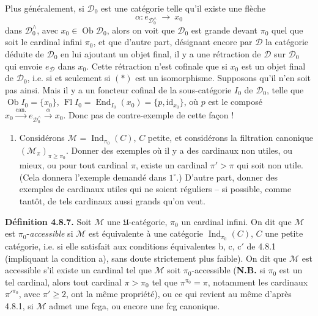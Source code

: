 \documentclass[11pt]{article}
\newcommand{\msp}[1]{\marginpar{\footnotesize [#1]}}
\newcommand{\Ob}{\operatorname{Ob}}
\newcommand{\Ind}{\operatorname{Ind}}
\newcommand{\End}{\operatorname{End}}
\newcommand{\Fl}{\operatorname{Fl}}
\begin{document}
Plus généralement, si $\mathcal{D}_0$ est une catégorie telle qu'il existe une flèche
\[
\alpha : e_{\mathcal{D}_0^\wedge} \ \longrightarrow \ x_0 \tag*{$(*)$}
\]
dans $\mathcal{D}_0^\wedge$, avec $x_0\in\Ob\mathcal{D}_0$, alors on voit que $\mathcal{D}_0$ est grande devant $\pi_0$ quel que soit le cardinal infini $\pi_0$, et que d'autre part, désignant encore par $\mathcal{D}$ la catégorie déduite de $\mathcal{D}_0$ en lui ajoutant un objet final, il y a une rétraction de $\mathcal{D}$ sur $\mathcal{D}_0$ qui envoie $e_{\mathcal{D}}$ dans $x_0$. Cette rétraction n'est cofinale que si $x_0$ est un objet final de $\mathcal{D}_0$, i.e. si et seulement si $(*)$ est un isomorphisme. Supposons qu'il n'en soit pas ainsi. Mais il y a un foncteur cofinal de la sous-catégorie $I_0$ de $\mathcal{D}_0$, telle que $\Ob I_0=\{x_0\}$, $\Fl I_0=\End_{I_0}(x_0)=\{p,\mathrm{id}_{x_0}\}$, où $p$ est le composé $x_0\xrightarrow{\text{can.}}e_{\mathcal{D}_0^\wedge}\xrightarrow{\alpha}x_0$. Donc pas de contre-exemple de cette façon !

\msp{page 205}
\begin{enumerate}
\item[4)] Considérons $\mathcal{M}=\Ind_{\pi_0}(C)$, $C$ petite, et considérons la filtration canonique $(\mathcal{M}_\pi)_{\pi\geqslant\pi_0}$. Donner des exemples où il y a des cardinaux non utiles, ou mieux, ou pour tout cardinal $\pi$, existe un cardinal $\pi'>\pi$ qui soit non utile. (Cela donnera l'exemple demandé dans $1^\circ$.) D'autre part, donner des exemples de cardinaux utiles qui ne soient réguliers -- si possible, comme tantôt, de tels cardinaux aussi grands qu'on veut.
\end{enumerate}

\textbf{Définition 4.8.7.} Soit $\mathcal{M}$ une $\mathfrak{U}$-catégorie, $\pi_0$ un cardinal infini. On dit que $\mathcal{M}$ est $\pi_0$-\textit{accessible} si $\mathcal{M}$ est équivalente à une catégorie $\Ind_{\pi_0}(C)$, $C$ une petite catégorie, i.e. si elle satisfait aux conditions équivalentes b, c, c$'$ de 4.8.1 (impliquant la condition a), sans doute strictement plus faible). On dit que $\mathcal{M}$ est accessible s'il existe un cardinal tel que $\mathcal{M}$ soit $\pi_0$-accessible (\textbf{N.B.} si $\pi_0$ est un tel cardinal, alors tout cardinal $\pi>\pi_0$ tel que $\pi^{\pi_0}=\pi$, notamment les cardinaux $\pi'^{\pi_0}$, avec $\pi'\geqslant 2$, ont la même propriété), ou ce
\msp{page 206}
qui revient au même d'après 4.8.1, si $\mathcal{M}$ admet une fcga, ou encore une fcg canonique.
\end{document}
